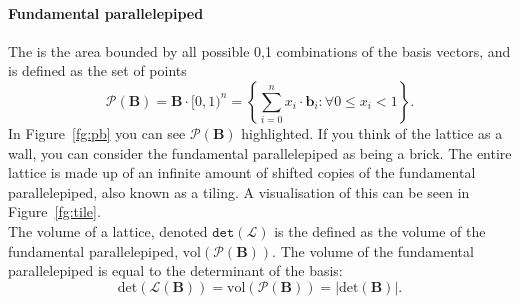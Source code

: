 \documentclass[a4paper, 11pt, openany]{book}
\begin{document}
\paragraph{Fundamental parallelepiped} The  is the area bounded by all possible 0,1 combinations of the basis vectors, and is defined as the set of points $$\mathcal{P}(\textbf{B}) = \textbf{B}\cdot[0,1)^{n} = \left\{ \sum_{i=0}^{n} x_{i}\cdot\textbf{b}_{i}:\forall 0 \le x_{i} < 1 \right\}.$$
In Figure~\ref{fg:pb} you can see $\mathcal{P}(\textbf{B})$ highlighted.
If you think of the lattice as a wall, you can consider the fundamental parallelepiped as being a brick. The entire lattice is made up of an infinite amount of shifted copies of the fundamental parallelepiped, also known as a tiling. A visualisation of this can be seen in Figure~\ref{fg:tile}.
\\
The volume of a lattice, denoted $\mathtt{det}(\mathcal{L})$ is the defined as the volume of the fundamental parallelepiped, $\text{vol}(\mathcal{P}(\textbf{B}))$.
The volume of the fundamental parallelepiped is equal to the determinant of the basis:
$$\text{det}(\mathcal{L}(\textbf{B})) = \text{vol}(\mathcal{P}(\textbf{B})) = |\text{det}(\textbf{B})|. $$
\end{document}
